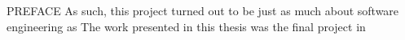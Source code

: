 \documentclass[11pt, a4paper, oneside]{Thesis} %
\begin{document}
{%

\mainmatter %

\pagestyle{fancy} %


PREFACE
As such, this project turned out to be just as much about software engineering as 
The work presented in this thesis was the final project in
%
%
%

%
%

%


% 
% 
%



\appendix %







\backmatter


\label{Bibliography}


}
\end{document}

